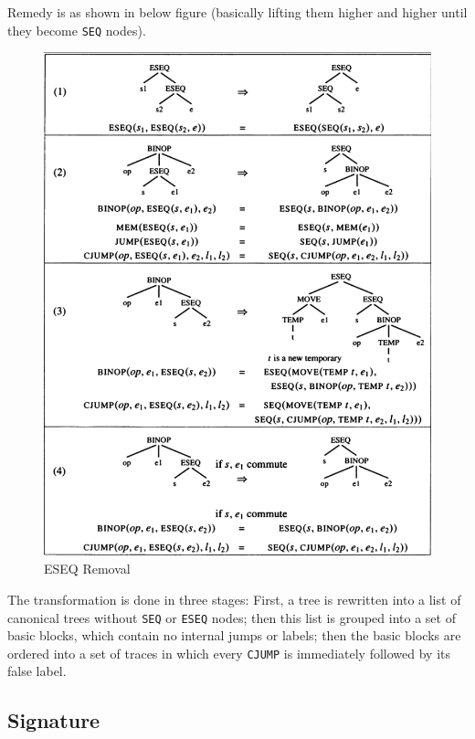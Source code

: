 \documentclass[
]{article}
\begin{document}
Remedy is as shown in below figure (basically lifting them higher and
higher until they become
\texttt{SEQ}
nodes).

\begin{figure}
\centering
\includegraphics{assets/canon1.png}
\caption{ESEQ Removal}
\end{figure}

The transformation is done in three stages: First, a tree is rewritten
into a list of canonical trees without
\texttt{SEQ} or
\texttt{ESEQ}
nodes; then this list is grouped into a set of basic blocks, which
contain no internal jumps or labels; then the basic blocks are ordered
into a set of traces in which every
\texttt{CJUMP}
is immediately followed by its false label.

\hypertarget{signature}{%
\subsection{Signature}\label{signature}}
\end{document}
